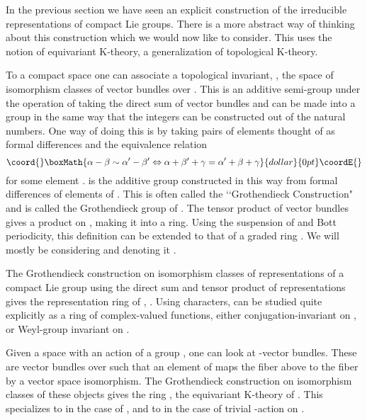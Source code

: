 \documentclass[a4paper,a4paper]{article}
\theoremstyle{conjecture}
\begin{document}
In the previous section we have seen an explicit construction
of the irreducible representations of compact Lie groups.
There is a more abstract way of thinking about this construction
which we would now like to consider.  This uses the notion
of equivariant K-theory, a generalization of topological K-theory.

To a compact space \coordHE{} one can associate a topological invariant,
\coordHE{}, the space of isomorphism classes of vector
bundles over \coordHE{}.  This is an additive semi-group under the operation
of taking the direct sum of vector bundles and can be made into
a group in the same way that the integers can be constructed out of the
natural numbers.  One way of doing this is by taking pairs of elements
thought of as formal differences \myHighlight{$\alpha - \beta$}\coordHE{} and the equivalence
relation
$$\coord{}\boxMath{\alpha - \beta \sim \alpha'-\beta' \Leftrightarrow \alpha + \beta' +\gamma = \alpha'+\beta +\gamma}{dollar}{0pt}\coordE{}$$
for some element \myHighlight{$\gamma$}\coordHE{}.  \coordHE{} is the additive group constructed in this
way
from formal differences of elements of \coordHE{}. This is often called
the \lq\lq Grothendieck Construction" and \coordHE{} is called the Grothendieck group
of \coordHE{}.
The tensor product of vector bundles gives a product on \coordHE{}, making it
into a ring.  Using the suspension of \coordHE{} and Bott periodicity, this definition
can be extended to that of a graded ring \coordHE{}.  We will mostly be considering
\coordHE{} and denoting it \coordHE{}.

The Grothendieck construction on isomorphism classes of
representations of a compact Lie group \coordHE{} using the direct sum and tensor product
of representations gives the representation
ring of \coordHE{}, \coordHE{}.  Using characters, \coordHE{} can be studied quite explicitly
as a ring of complex-valued functions, either conjugation-invariant on \coordHE{}, or Weyl-group
invariant on \coordHE{}.

Given a space \coordHE{} with an action of a group \coordHE{}, one can look at \coordHE{}-vector bundles. These are vector
bundles \coordHE{} over \coordHE{} such that an element \coordHE{} of \coordHE{} maps the fiber \coordHE{} above \coordHE{} to the fiber \coordHE{} by
a vector space isomorphism.  The Grothendieck construction on isomorphism classes of these objects gives
the ring \coordHE{}, the equivariant K-theory of \coordHE{}.  This specializes to \coordHE{} in the case of \coordHE{}, and
to \coordHE{} in the case of trivial \coordHE{}-action on \coordHE{}.
\end{document}
